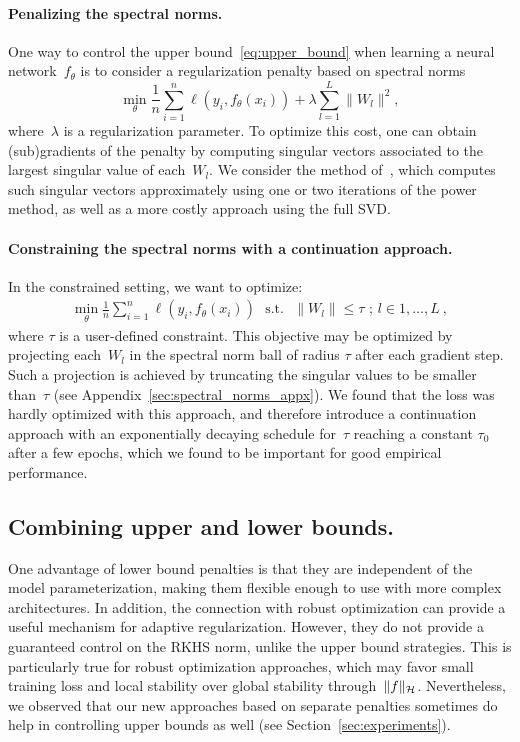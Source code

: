 \paragraph{Penalizing the spectral norms.}
One way to control the upper bound~\eqref{eq:upper_bound} when learning a neural network~$f_\theta$
is to consider a regularization penalty based on spectral norms
\begin{equation} 
	\label{eq:optimization_problem_penalized} 
	\min_{\theta}\frac{1}{n} \sum_{i=1}^{n} \ell(y_i, f_{\theta}(x_i)) + \lambda \sum_{l=1}^{L} \|W_l\|^2,
\end{equation}
where~$\lambda$ is a regularization parameter.
To optimize this cost, one can obtain (sub)gradients of the penalty by computing singular vectors
associated to the largest singular value of each~$W_l$.
We consider the method of~\citet{yoshida2017spectral}, which computes such singular vectors approximately
using one or two iterations of the power method, as well as a more costly approach using the full SVD.

\paragraph{Constraining the spectral norms with a continuation approach.}
In the constrained setting, we want to optimize:
\begin{equation*}
\begin{aligned}
\min_{\theta}\frac{1}{n} \sum_{i=1}^{n} \ell(y_i, f_{\theta}(x_i)) \text{~~s.t.~~} \|W_l\| \leq \tau \text{ ; } l\in 1, \dots, L~,
\end{aligned}
\end{equation*}
where $\tau$ is a user-defined constraint.
This objective may be optimized by projecting each~$W_l$ in the
spectral norm ball of radius $\tau$ after each gradient step.
Such a projection is achieved by truncating the singular values to be smaller than~$\tau$ (see Appendix~\ref{sec:spectral_norms_appx}).
We found that the loss was hardly optimized with this approach,
and therefore introduce a continuation approach with an exponentially
decaying schedule for~$\tau$ reaching a constant $\tau_0$
after a few epochs, which we found to be important for good empirical performance.

\subsection{Combining upper and lower bounds.}
One advantage of lower bound penalties is that they are independent of
the model parameterization, making them flexible enough to use with more complex architectures.
In addition, the connection with robust optimization can provide a useful mechanism for adaptive regularization.
However, they do not provide a guaranteed control on the RKHS norm, unlike the upper bound strategies.
This is particularly true for robust optimization approaches, which may favor small training loss
and local stability over global stability through~$\|f\|_{\mathcal H}$.
Nevertheless, we observed that our new approaches based on separate penalties
sometimes do help in controlling upper bounds as well (see Section~\ref{sec:experiments}).

